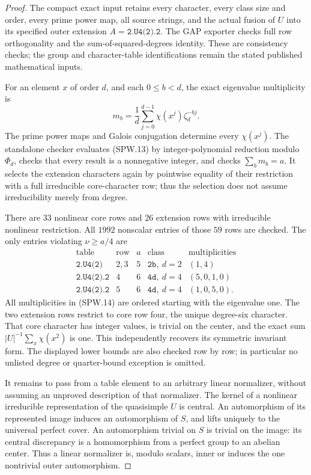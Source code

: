 \begin{proof}
The compact exact input retains every character, every class
size and order, every prime power map, all source strings, and
the actual fusion of $U$ into its specified outer extension
$A=\texttt{2.U4(2).2}$.  The GAP exporter checks full row
orthogonality and the sum-of-squared-degrees identity.  These
are consistency checks; the group and character-table
identifications remain the stated published mathematical inputs.

For an element $x$ of order $d$, and each $0\le b<d$, the
exact eigenvalue multiplicity is
\[
 m_b=\frac1d\sum_{j=0}^{d-1}
               \chi(x^j)\zeta_d^{-bj}.                    \tag{SPW.13}
\]
The prime power maps and Galois conjugation determine every
$\chi(x^j)$.  The standalone checker evaluates (SPW.13) by
integer-polynomial reduction modulo $\Phi_d$, checks that
every result is a nonnegative integer, and checks
$\sum_bm_b=a$.  It selects the extension characters again by
pointwise equality of their restriction with a full irreducible
core-character row; thus the selection does not assume
irreducibility merely from degree.

There are $33$ nonlinear core rows and $26$ extension rows
with irreducible nonlinear restriction.  All $1992$ nonscalar
entries of those $59$ rows are checked.  The only entries
violating $\nu\ge a/4$ are
\[
\begin{array}{c|c|c|c|c}
\text{table}&\text{row}&a&\text{class}&\text{multiplicities}\\\hline
\texttt{2.U4(2)}&2,3&5&\texttt{2b},\ d=2&(1,4)\\
\texttt{2.U4(2).2}&4&6&\texttt{4d},\ d=4&(5,0,1,0)\\
\texttt{2.U4(2).2}&5&6&\texttt{4d},\ d=4&(1,0,5,0).
\end{array}                                                \tag{SPW.14}
\]
All multiplicities in (SPW.14) are ordered starting with the
eigenvalue one.  The two extension rows restrict to core row
four, the unique degree-six character.  That core character
has integer values, is trivial on the center, and the exact
sum $|U|^{-1}\sum_x\chi(x^2)$ is one.  This independently
recovers its symmetric invariant form.  The displayed lower
bounds are also checked row by row; in particular no unlisted
degree or quarter-bound exception is omitted.

It remains to pass from a table element to an arbitrary linear
normalizer, without assuming an unproved description of that
normalizer.  The kernel of a nonlinear irreducible
representation of the quasisimple $U$ is central.  An
automorphism of its represented image induces an automorphism
of $S$, and lifts uniquely to the universal perfect cover.
An automorphism trivial on $S$ is trivial on the image: its
central discrepancy is a homomorphism from a perfect group to
an abelian center.  Thus a linear normalizer is, modulo
scalars, inner or induces the one nontrivial outer automorphism.


\end{proof}

